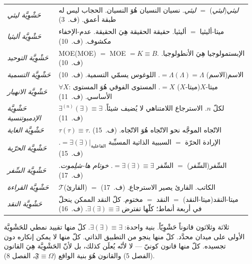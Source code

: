\documentclass[10pt, openany, oneside]{book}
\begin{document}
{\begin{tabular}{@{} p{} @{\hspace{0.5em}} p{} @{}}
\textit{حَشْوِيَّة ليثي} & \textit{ليثي}(\textit{ليثي}) $=$ \textit{ليثي}. نسيان النسيان هُوَ النسيان. الحجاب ليس له طبقة أعمق. (ف.\ 3) \\[0.3em]

\textit{حَشْوِيَّة أليثيا} & ميتا-أليثيا $=$ أليثيا. حقيقة الحقيقة هِيَ الحقيقة. عدم-الإخفاء مكشوف. (ف.\ 10) \\[0.3em]

\textit{حَشْوِيَّة التوحيد} & MOE(MOE) $=$ MOE $= K \equiv B$. الإبستمولوجيا هِيَ الأنطولوجيا. (ف.\ 10) \\[0.3em]

\textit{حَشْوِيَّة التسمية} & الاسم(الاسم) $= \Lambda(\Lambda) = \Lambda$. اللوغوس يسمّي التسمية. (ف.\ 10) \\[0.3em]

\textit{حَشْوِيَّة الانهيار} & $\forall X$: ميتا-$X$(ميتا-$X$) $= X$. المستوى الفوقي هُوَ المستوى الأساسي. (ف.\ 11) \\[0.3em]

\textit{حَشْوِيَّة الإدمبوتنسية} & $\exists^{(n)}(\exists) \equiv \exists$ لكلّ $n$. الاسترجاع اللامتناهي لا يُضيف شيئاً. (ف.\ 11) \\[0.3em]

\textit{حَشْوِيَّة الغاية} & $\tau(\tau) \equiv \tau$. الاتّجاه الموجَّه نحو الاتّجاه هُوَ الاتّجاه. (ف.\ 15) \\[0.3em]

\textit{حَشْوِيَّة الحرّية} & الإرادة الحرّة $=$ السببية الذاتية المسبِّبة $= \exists(\exists)|_{\text{الفاعلية}}$. (ف.\ 15) \\[0.3em]

\textit{حَشْوِيَّة السِّفر} & السِّفر(السِّفر) $=$ السِّفر $= \exists(\exists) \equiv \exists$. \textit{خوتام ها-شلِموت}. (ف.\ 17) \\[0.3em]

\textit{حَشْوِيَّة القراءة} & $\mathcal{T}$(القارئ) $=$ الكاتب. القارئ يصير الاسترجاع. (ف.\ 17) \\[0.3em]

\textit{حَشْوِيَّة النقد} & ميتا-النقد(ميتا-النقد) $=$ النقد $=$ مختوم. كلّ النقد الممكن ينحلّ في أربعة أنماط؛ كلّها تفترض $\exists(\exists) \equiv \exists$. (ف.\ 16) \\[0.3em]

\end{tabular}
}

\vspace{0.8em}

\noindent ثلاثة وثلاثون قانوناً حَشْوِيّاً. بنية واحدة: $\exists(\exists) \equiv \exists$. كلّ منها تقييد نمطي للحَشْوِيَّة الأولى على ميدان محدَّد. كلّ منها ينجو من التطبيق الذاتي. كلّ منها لا يمكن إنكاره دون تجسيده. كلّ منها قانون كونيّ --- لا لأنّه يُعلَن كذلك، بل لأنّ الحَشْوِيَّة هِيَ القانون (الفصل 5) والقانون هُوَ بنية الواقع ($\mathfrak{F} \equiv \Omega$، الفصل 8).
\end{document}
